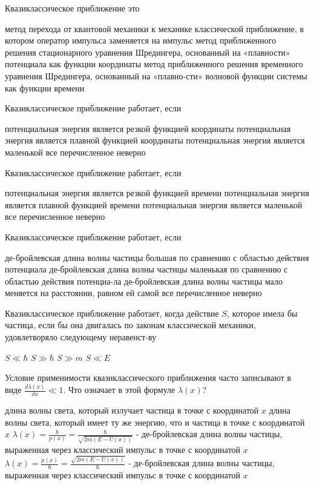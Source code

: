 \documentclass[11pt,a4paper]{exam}
\begin{document}
\begin{questions}

\question Квазиклассическое приближение это
\begin{choices}
\choice метод перехода от квантовой механики к механике классической
\choice приближение, в котором оператор импульса заменяется на импульс
\choice метод приближенного решения стационарного уравнения Шредингера, основанный на «плавности» потенциала как функции координаты
\choice метод приближенного решения временного уравнения Шредингера, основанный на «плавно-сти» волновой функции системы как функции времени
\end{choices}

\question Квазиклассическое приближение работает, если 
\begin{choices}
\choice потенциальная энергия является резкой функцией координаты
\choice потенциальная энергия является плавной функцией координаты
\choice потенциальная энергия является маленькой
\choice все перечисленное неверно
\end{choices}

\question Квазиклассическое приближение работает, если 
\begin{choices}
\choice потенциальная энергия является резкой функцией времени
\choice потенциальная энергия является плавной функцией времени
\choice потенциальная энергия является маленькой
\choice все перечисленное неверно
\end{choices}

\question Квазиклассическое приближение работает, если 
\begin{choices}
\choice де-бройлевская длина волны частицы большая по сравнению с областью действия потенциала
\choice де-бройлевская длина волны частицы маленькая по сравнению с областью действия потенциа-ла
\choice де-бройлевская длина волны частицы мало меняется на расстоянии, равном ей самой
\choice все перечисленное неверно
\end{choices}

\question Квазиклассическое приближение работает, когда действие $S$, которое имела бы частица, если бы она двигалась по законам классической механики, удовлетворяло следующему неравенст-ву
\begin{choices}
\choice $S \ll \hbar $       
\choice $S \gg \hbar $    
\choice $S \gg m$      
\choice $S \ll E$
\end{choices}

\question Условие применимости квазиклассического приближения часто записывают в виде $\frac{{d\lambda (x)}}{{dx}} \ll 1$. Что означает в этой формуле $\lambda (x)$?
\begin{choices}
\choice длина волны света, который излучает частица в точке с координатой $x$
\choice длина волны света, который имеет ту же энергию, что и частица в точке с координатой $x$
\choice $\lambda (x) = \frac{\hbar }{{p(x)}} = \frac{\hbar }{{\sqrt {2m(E - U(x))} }}$ - де-бройлевская длина волны частицы, выраженная через классический импульс в точке с координатой $x$
\choice $\lambda (x) = \frac{{p(x)}}{\hbar } = \frac{{\sqrt {2m(E - U(x))} }}{\hbar }$ - де-бройлевская длина волны частицы, выраженная через классический импульс в точке с координатой $x$
\end{choices}


\end{questions}
\end{document}
